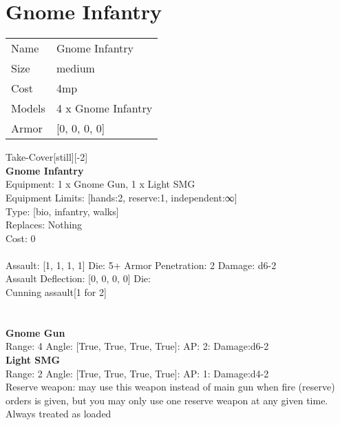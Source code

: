 \pagebreak

\section{ Gnome Infantry }

\begin{tabular}{ll}
  Name & Gnome Infantry \\
  Size & medium\\
  Cost & 4mp\\
  Models & 4 x Gnome Infantry\\
  Armor & [0, 0, 0, 0]\\
\end{tabular}

\noindent Take-Cover[still][-2]\\ 


{\bf Gnome Infantry } \\
Equipment: 1 x Gnome Gun, 1 x Light SMG \\
Equipment Limits: [hands:2, reserve:1, independent:∞] \\
Type: [bio, infantry, walks] \\
Replaces: Nothing \\
Cost: 0\\
\ \\
Assault: [1, 1, 1, 1] Die: 5+ Armor Penetration: 2 Damage: d6-2 \\
Assault Deflection: [0, 0, 0, 0] Die: \\
\indent Cunning assault[1 for 2]\\ 
 
\ \\

\ \\
{\bf Gnome Gun } \\



Range: 4  Angle: [True, True, True, True]: AP: 2: Damage:d6-2 \\




{\bf Light SMG } \\



Range: 2  Angle: [True, True, True, True]: AP: 1: Damage:d4-2 \\
Reserve weapon: may use this weapon instead of main gun when fire (reserve) orders is given, but you may only use one reserve weapon at any given time.\\ 
Always treated as loaded\\ 




